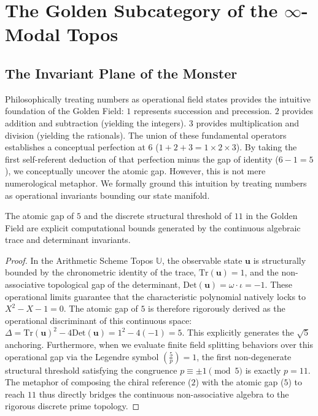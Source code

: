 \section{The Golden Subcategory of the \texorpdfstring{$\infty$}{∞}-Modal Topos}

\subsection{The Invariant Plane of the Monster}\label{sec:invariant-plane}

Philosophically treating numbers as operational field states provides the intuitive foundation of the Golden Field: $1$ represents succession and precession. $2$ provides addition and subtraction (yielding the integers). $3$ provides multiplication and division (yielding the rationals). The union of these fundamental operators establishes a conceptual perfection at $6$ ($1+2+3 = 1 \times 2 \times 3$). By taking the first self-referent deduction of that perfection minus the gap of identity ($6 - 1 = 5$), we conceptually uncover the atomic gap. However, this is not mere numerological metaphor. We formally ground this intuition by treating numbers as operational invariants bounding our state manifold.

\begin{theorem}
The atomic gap of $5$ and the discrete structural threshold of $11$ in the Golden Field are explicit computational bounds generated by the continuous algebraic trace and determinant invariants.
\end{theorem}

\begin{proof}
In the Arithmetic Scheme Topos $\mathbb{U}$, the observable state $\mathbf{u}$ is structurally bounded by the chronometric identity of the trace, $\mathrm{Tr}(\mathbf{u}) = 1$, and the non-associative topological gap of the determinant, $\mathrm{Det}(\mathbf{u}) = \omega \cdot \iota = -1$. These operational limits guarantee that the characteristic polynomial natively locks to $X^2 - X - 1 = 0$. The atomic gap of $5$ is therefore rigorously derived as the operational discriminant of this continuous space: $\Delta = \mathrm{Tr}(\mathbf{u})^2 - 4\mathrm{Det}(\mathbf{u}) = 1^2 - 4(-1) = 5$. This explicitly generates the $\sqrt{5}$ anchoring. Furthermore, when we evaluate finite field splitting behaviors over this operational gap via the Legendre symbol $\left(\frac{5}{p}\right) = 1$, the first non-degenerate structural threshold satisfying the congruence $p \equiv \pm 1 \pmod 5$ is exactly $p = 11$. The metaphor of composing the chiral reference ($2$) with the atomic gap ($5$) to reach $11$ thus directly bridges the continuous non-associative algebra to the rigorous discrete prime topology. \qedhere
\end{proof}

